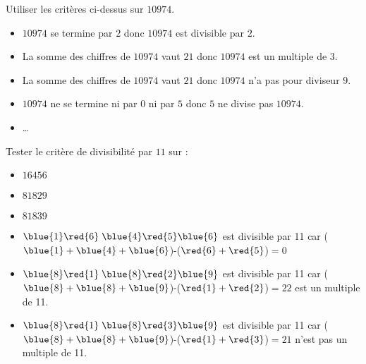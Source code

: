 \begin{exemple}
	Utiliser les critères ci-dessus sur $\num{10974}$.
	\correction
	\begin{itemize}
		\item $\num{10974}$ se termine par $2$ donc $\num{10974}$ est divisible par $2$.
		\item La somme des chiffres de $\num{10974}$ vaut $21$ donc $\num{10974}$ est un multiple de $3$.
		\item La somme des chiffres de $\num{10974}$ vaut $21$ donc $\num{10974}$ n'a pas pour diviseur $9$.
		\item $\num{10974}$ ne se termine ni par $0$ ni par $5$ donc $5$ ne divise pas $\num{10974}$.
		\item \dots		
	\end{itemize}
\end{exemple}

\begin{methode}
	\exercice 
	Tester le critère de divisibilité par $11$ sur :
	\begin{itemize}
		\item $\num{16456}$
		\item $\num{81829}$
		\item $\num{81839}$
	\end{itemize}
	\correction
	\begin{itemize}
		\item $\blue{1}\red{6}\;\blue{4}\red{5}\blue{6}$ est divisible par 11 car ($\blue{1}+\blue{4}+\blue{6}$)-($\red{6}+\red{5}$)$=0$
		\item $\blue{8}\red{1}\;\blue{8}\red{2}\blue{9}$ est divisible par 11 car ($\blue{8}+\blue{8}+\blue{9}$)-($\red{1}+\red{2}$)$=22$ est un multiple de 11.
		\item $\blue{8}\red{1}\;\blue{8}\red{3}\blue{9}$ est divisible par 11 car ($\blue{8}+\blue{8}+\blue{9}$)-($\red{1}+\red{3}$)$=21$ n'est pas un multiple de 11.
	\end{itemize}
\end{methode}

